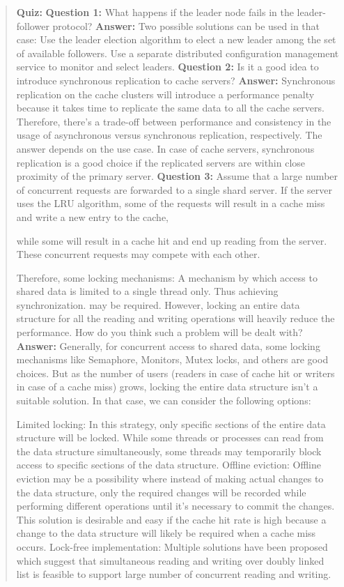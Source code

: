 \begin{quote}
\textbf{Quiz:}
\textbf{Question 1:} What happens if the leader node fails in the leader-follower protocol?
\textbf{Answer:} Two possible solutions can be used in that case: Use the leader election algorithm to elect a new leader among the set of available followers. Use a separate distributed configuration management service to monitor and select leaders.
\textbf{Question 2:} Is it a good idea to introduce synchronous replication to cache servers?
\textbf{Answer:} Synchronous replication on the cache clusters will introduce a performance penalty because it takes time to replicate the same data to all the cache servers. Therefore, there's a trade-off between performance and consistency in the usage of asynchronous versus synchronous replication, respectively. The answer depends on the use case. In case of cache servers, synchronous replication is a good choice if the replicated servers are within close proximity of the primary server.
\textbf{Question 3:} Assume that a large number of concurrent requests are forwarded to a single shard server. If the server uses the LRU algorithm, some of the requests will result in a cache miss and write a new entry to the cache,

while some will result in a cache hit and end up reading from the server. These concurrent requests may compete with each other.

Therefore, some  locking mechanisms: A mechanism by which access to shared data is limited to a single thread only. Thus achieving synchronization.  may be required. However, locking an entire data structure for all the reading and writing operations will heavily reduce the performance. How do you think such a problem will be dealt with?
\textbf{Answer:} Generally, for concurrent access to shared data, some locking mechanisms like Semaphore, Monitors, Mutex locks, and others are good choices. But as the number of users (readers in case of cache hit or writers in case of a cache miss) grows, locking the entire data structure isn't a suitable solution. In that case, we can consider the following options:

Limited locking: In this strategy, only specific sections of the entire data structure will be locked. While some threads or processes can read from the data structure simultaneously, some threads may temporarily block access to specific sections of the data structure. Offline eviction: Offline eviction may be a possibility where instead of making actual changes to the data structure, only the required changes will be recorded while performing different operations until it's necessary to commit the changes. This solution is desirable and easy if the cache hit rate is high because a change to the data structure will likely be required when a cache miss occurs.
Lock-free implementation: Multiple solutions have been proposed which suggest that simultaneous reading and writing over doubly linked list is feasible to support large number of concurrent reading and writing.
\end{quote}


